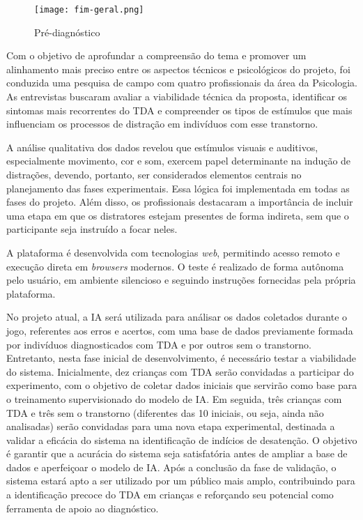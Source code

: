 \begin{figure}[H]
    \centering
    \caption{Pré-diagnóstico}%
    \label{fig:fim-geral}
    \texttt{[image: fim-geral.png]}%
\end{figure}

Com o objetivo de aprofundar a compreensão do tema e promover um alinhamento mais preciso entre os aspectos técnicos e psicológicos do projeto, foi conduzida uma pesquisa de campo com quatro profissionais da área da Psicologia. As entrevistas buscaram avaliar a viabilidade técnica da proposta, identificar os sintomas mais recorrentes do TDA e compreender os tipos de estímulos que mais influenciam os processos de distração em indivíduos com esse transtorno.

A análise qualitativa dos dados revelou que estímulos visuais e auditivos, especialmente movimento, cor e som, exercem papel determinante na indução de distrações, devendo, portanto, ser considerados elementos centrais no planejamento das fases experimentais. Essa lógica foi implementada em todas as fases do projeto.
Além disso, os profissionais destacaram a importância de incluir uma etapa em que os distratores estejam presentes de forma indireta, sem que o participante seja instruído a focar neles.

A plataforma é desenvolvida com tecnologias \textit{web}, permitindo acesso remoto e execução
direta em \textit{browsers} modernos. O teste é realizado de forma autônoma pelo usuário, em ambiente silencioso e seguindo instruções fornecidas pela própria plataforma.

No projeto atual, a IA será utilizada para análisar os dados coletados durante o jogo, referentes aos erros e acertos, com uma base de dados previamente formada por indivíduos diagnosticados com TDA e por outros sem o transtorno. Entretanto, nesta fase inicial de desenvolvimento, é necessário testar a viabilidade do sistema. Inicialmente, dez crianças com TDA serão convidadas a participar do experimento, com o objetivo de coletar dados iniciais que servirão como base para o treinamento supervisionado do modelo de IA. Em seguida, três crianças com TDA e três sem o transtorno (diferentes das 10 iniciais, ou seja, ainda não analisadas) 
serão convidadas para uma nova etapa experimental, destinada a validar a eficácia do sistema na identificação de indícios de desatenção. O objetivo é garantir que a acurácia do sistema seja satisfatória antes de ampliar a base de dados e aperfeiçoar o modelo de IA. Após a conclusão da fase de validação, o sistema estará apto a ser utilizado por um público mais amplo, contribuindo para a identificação precoce do TDA em crianças e reforçando seu potencial como ferramenta de apoio ao diagnóstico. 

